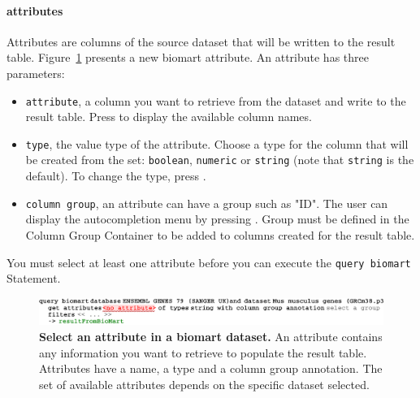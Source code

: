 \paragraph{attributes}
Attributes are columns of the source dataset that will be written to the result table. Figure~\ref{fig:attributeBiomart} presents a new biomart attribute. An attribute has three parameters:
\begin{itemize}

\item \texttt{attribute}, a column you want to retrieve from the dataset and write to the result table. Press \keys{\ctrl+\space} to display the available column names.
\item \texttt{type}, the value type of the attribute. Choose a type for the column that will be created from the set: \texttt{boolean}, \texttt{numeric} or \texttt{string} (note that \texttt{string} is the default). To change the type, press \keys{\ctrl+\space}.
\item \texttt{column group}, an attribute can have a group such as "ID". The user can display the autocompletion menu by pressing \keys{\ctrl+\space}. Group must be defined in the Column Group Container to be added to columns created for the result table.
\end{itemize}

\begin{remark}
You must select at least one attribute before you can execute the \texttt{query biomart} Statement.
\end{remark}

 \begin{figure}[h!tbp]
  \centering
  \includegraphics[width=\figWidthWide]{figures/BiomartAttribute.pdf}
\caption[Select an attribute in a biomart dataset.]{\textbf{Select an attribute in a biomart dataset.} An attribute contains any information you want to retrieve to populate the result table. Attributes have a name, a type and a column group annotation. The set of available attributes depends on the specific dataset selected.}
\label{fig:attributeBiomart}
\end{figure}
